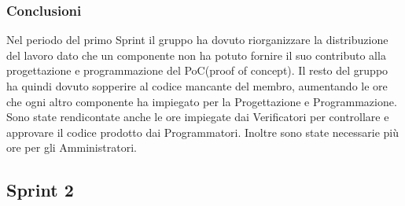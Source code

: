 \subsubsection{Conclusioni}
Nel periodo del primo Sprint il gruppo ha dovuto riorganizzare la distribuzione del lavoro dato che un componente non ha potuto fornire il suo contributo alla progettazione e programmazione del PoC(proof of concept). Il resto del gruppo ha quindi dovuto sopperire al codice mancante del membro, aumentando le ore che ogni altro componente ha impiegato per la Progettazione e Programmazione.
Sono state rendicontate anche le ore impiegate dai Verificatori per controllare e approvare il codice prodotto dai Programmatori.
Inoltre sono state necessarie più ore per gli Amministratori.
\subsection{Sprint 2}
\label{sec:sprint_2}

